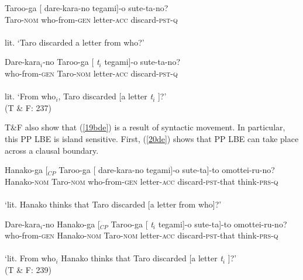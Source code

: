 \documentclass[
    output=paper,
    colorlinks,
    citecolor=brown,
]{langscibook}
\begin{document}
\begin{exe}
\ex \label{19de}
\begin{xlist}
\ex \label{19ade}
\gll Taroo-ga   [ dare-kara-no    tegami]-o    sute-ta-no?\\
Taro-\textsc{nom} {} who-from-\textsc{gen} letter-\textsc{acc} discard-\textsc{pst}-\textsc{q}\\\\
lit. ‘Taro discarded a letter from who?’


\ex \label{19bde}
\gll Dare-kara$_{i}$-no   Taroo-ga  [ \textit{t}$_{i}$       tegami]-o  sute-ta-no?\\
who-from-\textsc{gen} Taro-\textsc{nom} {} {} letter-\textsc{acc} discard-\textsc{pst}-\textsc{q}\\\\
lit. ‘From who$_{i}$, Taro discarded [a letter \textit{t}$_{i}$ ]?’\\
\hspace{72mm} (T \& F: 237)	

\end{xlist}
\end{exe}

T\&F also show that (\ref{19bde}) is a result of syntactic movement. In particular, this PP LBE is island sensitive. First, (\ref{20de}) shows that PP LBE can take place across a clausal boundary.  

\begin{exe}
\ex \label{20de}
\begin{xlist}
\ex \label{20ade}
\gll Hanako-ga  [$_{CP}$ Taroo-ga [ dare-kara-no    tegami]-o sute-ta]-to omottei-ru-no?\\
Hanako-\textsc{nom} {} Taro-\textsc{nom} {} who-from-\textsc{gen} letter-\textsc{acc} discard-\textsc{pst}-that think-\textsc{prs}-\textsc{q}\\\\
‘lit. Hanako thinks that Taro discarded [a letter from who]?’

\ex \label{20bde}
\gll Dare-kara$_{i}$-no Hanako-ga [$_{CP}$ Taroo-ga  [ \textit{t}$_{i}$  tegami]-o  sute-ta]-to  omottei-ru-no?\\
who-from-\textsc{gen} Hanako-\textsc{nom} {} Taro-\textsc{nom} {} {} letter-\textsc{acc} discard-\textsc{pst}-that think-\textsc{prs}-\textsc{q}\\\\
‘lit. From who$_{i}$ Hanako thinks that Taro discarded [a letter \textit{t}$_{i}$ ]?’\\
\hspace{72mm} (T \& F: 239)	
\end{xlist}

\end{exe}
\end{document}
